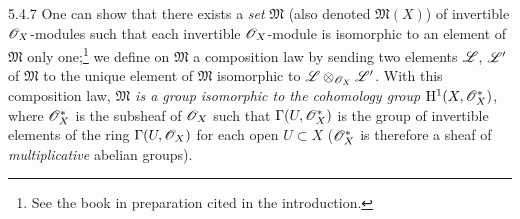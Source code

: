 \begin{env}{5.4.7}
\label{env-0.5.4.7}
One can show that there exists a \emph{set} $\mathfrak{M}$ (also denoted
$\mathfrak{M}(X)$) of invertible $\mathscr{O}_X$-modules such that each invertible
$\mathscr{O}_X$-module is isomorphic to an element of $\mathfrak{M}$ only
one;\footnote{See the book in preparation cited in the introduction.} we define
on $\mathfrak{M}$ a composition law by sending two elements $\mathscr{L}$, $\mathscr{L}'$
of $\mathfrak{M}$ to the unique element of $\mathfrak{M}$ isomorphic to
$\mathscr{L}\otimes_{\mathscr{O}_X}\mathscr{L}'$. With this composition law, \emph{$\mathfrak{M}$
is a group isomorphic to the cohomology group $\mathrm{H}^1(X,\mathscr{O}_X^*)$}, where
$\mathscr{O}_X^*$ is the subsheaf of $\mathscr{O}_X$ such that $\Gamma(U,\mathscr{O}_X^*)$ is the group
of invertible elements of the ring $\Gamma(U,\mathscr{O}_X)$ for each open $U\subset X$
($\mathscr{O}_X^*$ is therefore a sheaf of \emph{multiplicative} abelian groups).


\end{env}
